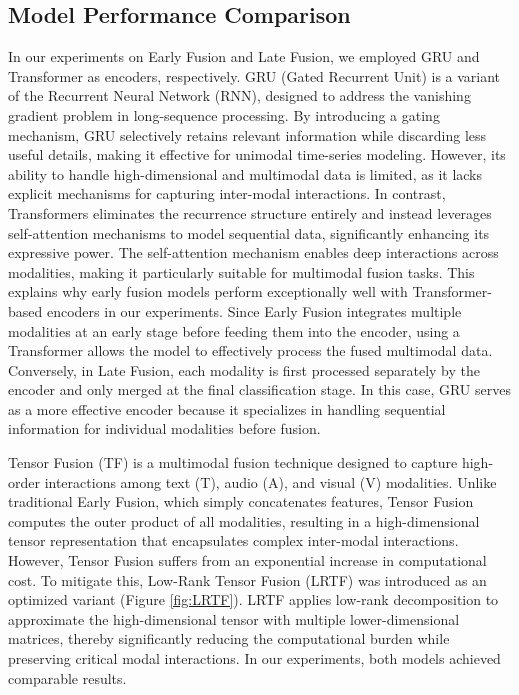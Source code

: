 \documentclass{article}
\begin{document}
\subsection{Model Performance Comparison}
In our experiments on Early Fusion and Late Fusion, we employed GRU and Transformer as encoders, respectively. GRU (Gated Recurrent Unit) is a variant of the Recurrent Neural Network (RNN), designed to address the vanishing gradient problem in long-sequence processing. By introducing a gating mechanism, GRU selectively retains relevant information while discarding less useful details, making it effective for unimodal time-series modeling. However, its ability to handle high-dimensional and multimodal data is limited, as it lacks explicit mechanisms for capturing inter-modal interactions. In contrast, Transformers eliminates the recurrence structure entirely and instead leverages self-attention mechanisms to model sequential data, significantly enhancing its expressive power. The self-attention mechanism enables deep interactions across modalities, making it particularly suitable for multimodal fusion tasks. This explains why early fusion models perform exceptionally well with Transformer-based encoders in our experiments. Since Early Fusion integrates multiple modalities at an early stage before feeding them into the encoder, using a Transformer allows the model to effectively process the fused multimodal data. Conversely, in Late Fusion, each modality is first processed separately by the encoder and only merged at the final classification stage. In this case, GRU serves as a more effective encoder because it specializes in handling sequential information for individual modalities before fusion.


Tensor Fusion (TF) is a multimodal fusion technique designed to capture high-order interactions among text (T), audio (A), and visual (V) modalities. Unlike traditional Early Fusion, which simply concatenates features, Tensor Fusion computes the outer product of all modalities, resulting in a high-dimensional tensor representation that encapsulates complex inter-modal interactions. However, Tensor Fusion suffers from an exponential increase in computational cost. To mitigate this, Low-Rank Tensor Fusion (LRTF) \cite{Liu2018EfficientLM} was introduced as an optimized variant (Figure \ref{fig:LRTF}). LRTF applies low-rank decomposition to approximate the high-dimensional tensor with multiple lower-dimensional matrices, thereby significantly reducing the computational burden while preserving critical modal interactions. In our experiments, both models achieved comparable results. 
\end{document}
